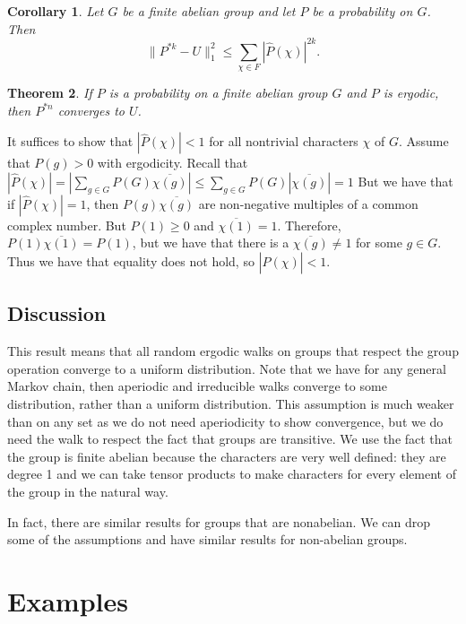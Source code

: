\documentclass[]{article}
\newtheorem{theorem}{Theorem}
\newtheorem{corollary}[theorem]{Corollary}
\theoremstyle{definition}
\numberwithin{theorem}{section}
\numberwithin{equation}{section}
\begin{document}
\begin{corollary}
	\label{cor:Convolution Inequality}
	Let $G$ be a finite abelian group and let $P$ be a probability on $G$. Then 
	\begin{equation}
	\|P^{\ast k} - U\|^2_{1} \leq \sum_{\chi \in F} |\widehat{P}(\chi)|^{2k}.
\end{equation}
\end{corollary}

\begin{theorem}
	If $P$ is a probability on a finite abelian group $G$ and $P$ is ergodic, then $P^{\ast n}$ converges to $U$.
\end{theorem}
It suffices to show that $|\widehat{P}(\chi)| < 1$ for all nontrivial characters $\chi$ of $G$. Assume that $P(g) > 0$ with ergodicity. Recall that $|\widehat{P}(\chi)| = |\sum_{g \in G} P(G) \overline{\chi(g)}| \leq \sum_{g \in G} P(G) |\overline{\chi(g)}| = 1$ But we have that if $|\widehat{P}(\chi)| = 1$, then $P(g) \overline{\chi(g)}$ are non-negative multiples of a common complex number. But $P(1) \geq 0$ and $\overline{\chi(1)} = 1$. Therefore, $P(1) \overline{\chi(1)} = P(1)$, but we have that there is a $\overline{\chi(g)} \neq 1$ for some $g \in G$. Thus we have that equality does not hold, so $|\widehat{P}(\chi)| < 1$. 

\subsection{Discussion}
This result means that all random ergodic walks on groups that respect the group operation converge to a uniform distribution. Note that we have for any general Markov chain, then aperiodic and irreducible walks converge to some distribution, rather than a uniform distribution. This assumption is much weaker than on any set as we do not need aperiodicity to show convergence, but we do need the walk to respect the fact that groups are transitive. We use the fact that the group is finite abelian because the characters are very well defined: they are degree 1 and we can take tensor products to make characters for every element of the group in the natural way. 

In fact, there are similar results for groups that are nonabelian. We can drop some of the assumptions and have similar results for non-abelian groups.

\section{Examples}
\end{document}
